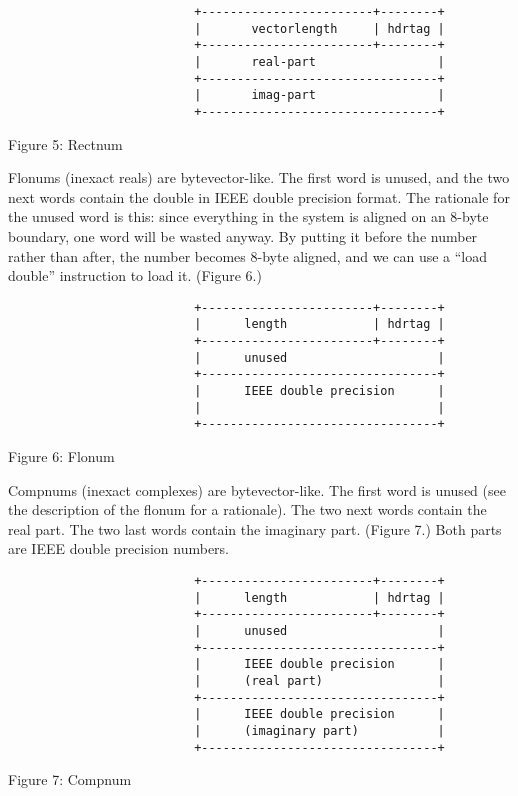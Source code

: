 \begin{minipage}{\linewidth}
\begin{verbatim}
                          +------------------------+--------+
                          |       vectorlength     | hdrtag |
                          +------------------------+--------+
                          |       real-part                 |
                          +---------------------------------+
                          |       imag-part                 |
                          +---------------------------------+
\end{verbatim}
\centerline{Figure 5: Rectnum}
\end{minipage}

Flonums (inexact reals) are bytevector-like. The first word is unused,
and the two next words contain the double in IEEE double precision
format. The rationale for the unused word is this: since everything in
the system is aligned on an 8-byte boundary, one word will be wasted
anyway. By putting it before the number rather than after, the number
becomes 8-byte aligned, and we can use a ``load double'' instruction
to load it. (Figure 6.)

\begin{minipage}{\linewidth}
\begin{verbatim}
                          +------------------------+--------+
                          |      length            | hdrtag |
                          +------------------------+--------+
                          |      unused                     |
                          +---------------------------------+
                          |      IEEE double precision      |
                          |                                 |
                          +---------------------------------+
\end{verbatim}
\centerline{Figure 6: Flonum}
\end{minipage}

Compnums (inexact complexes) are bytevector-like. The first word is
unused (see the description of the flonum for a rationale).  The two
next words contain the real part. The two last words contain the
imaginary part. (Figure 7.) Both parts are IEEE double precision
numbers.

\begin{minipage}{\linewidth}
\begin{verbatim}
                          +------------------------+--------+
                          |      length            | hdrtag |
                          +------------------------+--------+
                          |      unused                     |
                          +---------------------------------+
                          |      IEEE double precision      |
                          |      (real part)                |
                          +---------------------------------+
                          |      IEEE double precision      |
                          |      (imaginary part)           |
                          +---------------------------------+
\end{verbatim}
\centerline{Figure 7: Compnum}
\end{minipage}



